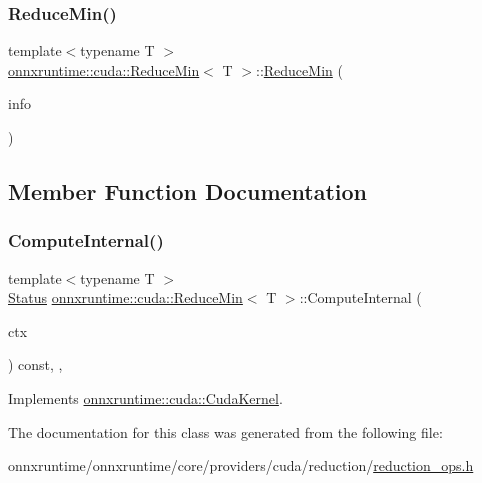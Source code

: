 \subsubsection{\texorpdfstring{Reduce\+Min()}{ReduceMin()}}
{\footnotesize\ttfamily template$<$typename T $>$ \\
\mbox{\hyperlink{classonnxruntime_1_1cuda_1_1ReduceMin}{onnxruntime\+::cuda\+::\+Reduce\+Min}}$<$ T $>$\+::\mbox{\hyperlink{classonnxruntime_1_1cuda_1_1ReduceMin}{Reduce\+Min}} (\begin{DoxyParamCaption}\item[{const \mbox{\hyperlink{classonnxruntime_1_1OpKernelInfo}{Op\+Kernel\+Info}} \&}]{info }\end{DoxyParamCaption})\hspace{0.3cm}{\ttfamily [inline]}}



\subsection{Member Function Documentation}
\mbox{\label{classonnxruntime_1_1cuda_1_1ReduceMin_a7834ec2b546591eb67744c2a09091fd6}} 
\subsubsection{\texorpdfstring{Compute\+Internal()}{ComputeInternal()}}
{\footnotesize\ttfamily template$<$typename T $>$ \\
\mbox{\hyperlink{classonnxruntime_1_1common_1_1Status}{Status}} \mbox{\hyperlink{classonnxruntime_1_1cuda_1_1ReduceMin}{onnxruntime\+::cuda\+::\+Reduce\+Min}}$<$ T $>$\+::Compute\+Internal (\begin{DoxyParamCaption}\item[{\mbox{\hyperlink{classonnxruntime_1_1OpKernelContext}{Op\+Kernel\+Context}} $\ast$}]{ctx }\end{DoxyParamCaption}) const\hspace{0.3cm}{\ttfamily [inline]}, {\ttfamily [override]}, {\ttfamily [virtual]}}



Implements \mbox{\hyperlink{classonnxruntime_1_1cuda_1_1CudaKernel_aca7af04ae448017d6023d30bba231ebb}{onnxruntime\+::cuda\+::\+Cuda\+Kernel}}.



The documentation for this class was generated from the following file\+:\begin{DoxyCompactItemize}
\item 
onnxruntime/onnxruntime/core/providers/cuda/reduction/\mbox{\hyperlink{cuda_2reduction_2reduction__ops_8h}{reduction\+\_\+ops.\+h}}\end{DoxyCompactItemize}
